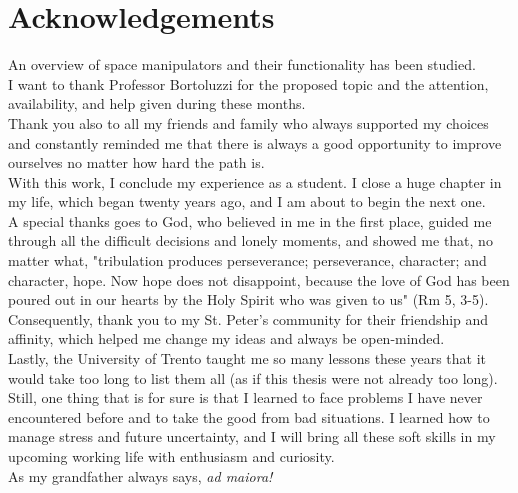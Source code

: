 \documentclass[a4paper,12pt,oneside]{report}
\begin{document}
\section{Acknowledgements}
An overview of space manipulators and their functionality has been studied. \\
I want to thank Professor Bortoluzzi for the proposed topic and the attention, availability, and help given during these months.\\
Thank you also to all my friends and family who always supported my choices and constantly reminded me that there is always a good opportunity to improve ourselves no matter how hard the path is.\\
With this work, I conclude my experience as a student. I close a huge chapter in my life, which began twenty years ago, and I am about to begin the next one.\\
A special thanks goes to God, who believed in me in the first place, guided me through all the difficult decisions and lonely moments, and showed me that, no matter what, "tribulation produces perseverance; perseverance, character; and character, hope. Now hope does not disappoint, because the love of God has been poured out in our hearts by the Holy Spirit who was given to us" (Rm 5, 3-5).\\
Consequently, thank you to my St. Peter's community for their friendship and affinity, which helped me change my ideas and always be open-minded.\\
Lastly, the University of Trento taught me so many lessons these years that it would take too long to list them all (as if this thesis were not already too long). Still, one thing that is for sure is that I learned to face problems I have never encountered before and to take the good from bad situations. I learned how to manage stress and future uncertainty, and I will bring all these soft skills in my upcoming working life with enthusiasm and curiosity.\\
As my grandfather always says, \textit{ad maiora!}
\newpage
\end{document}
